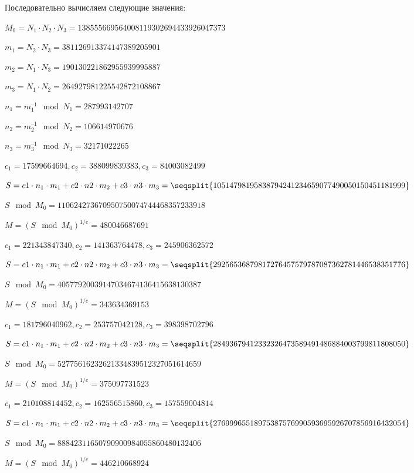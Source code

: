 \begin{table}[H]
\begin{tabular}{|c|c|c|}
	\end{tabular}
\end{table}


Последовательно вычисляем следующие значения:

$M_0 = N_1 \cdot N_2 \cdot N_3 = 138555669564008119302694433926047373$

$m_1 = N_2 \cdot N_3 = 381126913374147389205901$

$m_2 = N_1 \cdot N_3 = 190130221862955939995887$

$m_3 = N_1 \cdot N_2 = 264927981225542872108867$

$n_1 = m_1 ^ {–1} \mod{N_1} = 287993142707$

$n_2 = m_2 ^ {–1} \mod{N_2} = 106614970676$

$n_3 = m_3 ^ {–1} \mod{N_3} = 32171022265$


$c_1=17599664694, c_2=388099839383, c_3=84003082499$

$S = c1 \cdot n_1 \cdot m_1 + c2 \cdot n2 \cdot m_2 + c3 \cdot n3 \cdot m_3 = \seqsplit{10514798195838794241234659077490050150451181999}$

$S \mod{M_0} = 110624273670950750074744468357233918$

$M = (S \mod{M_0})^{1/e} = 480046687691$


$c_1=221343847340, c_2=141363764478, c_3=245906362572$

$S = c1 \cdot n_1 \cdot m_1 + c2 \cdot n2 \cdot m_2 + c3 \cdot n3 \cdot m_3 = \seqsplit{29256536879817276457579787087362781446538351776}$

$S \mod{M_0} = 40577920039147034674136415638130387$

$M = (S \mod{M_0})^{1/e} = 343634369153$


$c_1=181796040962, c_2=253757042128, c_3=398398702796$

$S = c1 \cdot n_1 \cdot m_1 + c2 \cdot n2 \cdot m_2 + c3 \cdot n3 \cdot m_3 = \seqsplit{28493679412332326473589491486884003799811808050}$

$S \mod{M_0} = 52775616232621334839512327051614659$

$M = (S \mod{M_0})^{1/e} = 375097731523$


$c_1=210108814452, c_2=162556515860, c_3=157559004814$

$S = c1 \cdot n_1 \cdot m_1 + c2 \cdot n2 \cdot m_2 + c3 \cdot n3 \cdot m_3 = \seqsplit{27699965518975387576990593695926707856916432054}$

$S \mod{M_0} = 88842311650790900984055860480132406$

$M = (S \mod{M_0})^{1/e} = 446210668924$


